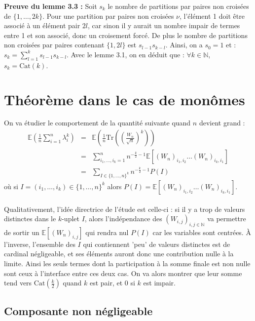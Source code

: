 \documentclass[10pt,a4paper]{article}
\begin{document}
\textbf{Preuve du lemme 3.3 :} Soit $s_k$ le nombre de partitions par paires non croisées de $\{1,\dots,2k\}$. Pour une partition par paires non croisées $\nu$, l'élément 1 doit être associé à un élément pair $2l$, car sinon il y aurait un nombre impair de termes entre 1 et son associé, donc un croisement forcé. De plus le nombre de partitions non croisées par paires contenant $\{1,2l\}$ est $s_{l-1}s_{k-l}$. Ainsi, on a $s_0 = 1$ et : $s_k = \sum_{l=1}^k s_{l-1}s_{k-l}$. Avec le lemme 3.1, on en déduit que : $\forall k \in \mathbb{N}$, $s_k = \text{Cat}(k) $.\\

\section{Théorème dans le cas de monômes}

On va étudier le comportement de la quantité suivante quand $n$ devient grand : 
\begin{eqnarray*}
\mathbb{E}\left (\frac{1}{n} \sum_{i=1}^n \lambda_i^k\right )&=&\mathbb{E}\left (\frac{1}{n}\text{Tr}\left (\left (\frac{W_n}{\sqrt{n}}\right )^k\right )\right )\\
&=&\sum_{i_1,\dots,i_k=1}^n n^{-\frac{k}{2}-1}\mathbb{E}[(W_n)_{i_1,i_2}\dots(W_n)_{i_k,i_1}] \\
&=&\sum_{I \in \{1,\dots,n\}^k} n^{-\frac{k}{2}-1}P(I)\end{eqnarray*}
où si $I=(i_1,\dots,i_k) \in \{1,\dots,n\}^k $ alors $P(I)=\mathbb{E}[(W_n)_{i_1,i_2}\dots(W_n)_{i_k,i_1}]$. \\\\

Qualitativement, l'idée directrice de l'étude est celle-ci : si il y a trop de valeurs distinctes dans le $k$-uplet $I$, alors l'indépendance des $(W_{i,j})_{i,j \in \mathbb{N}}$ va permettre de sortir un $\mathbb{E}[(W_n)_{i,j}]$ qui rendra nul $P(I)$ car les variables sont centrées. À l'inverse, l'ensemble des $I$ qui contiennent 'peu' de valeurs distinctes est de cardinal négligeable, et ses éléments auront donc une contribution nulle à la limite. Ainsi les seuls termes dont la participation à la somme finale est non nulle sont ceux à l'interface entre ces deux cas. On va alors montrer que leur somme tend vers $\text{Cat}(\frac{k}{2})$ quand $k$ est pair, et $0$ si $k$ est impair.

\subsection{Composante non négligeable}
\end{document}
